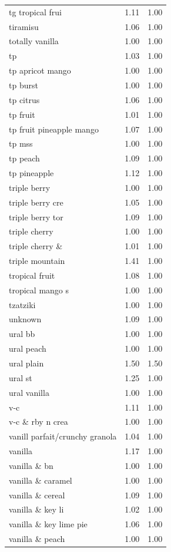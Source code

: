 \begin{table}
\begin{tabular}{lrr}
tg tropical frui & 1.11 & 1.00 \\
tiramisu & 1.06 & 1.00 \\
totally vanilla & 1.00 & 1.00 \\
tp & 1.03 & 1.00 \\
tp apricot mango & 1.00 & 1.00 \\
tp burst & 1.00 & 1.00 \\
tp citrus & 1.06 & 1.00 \\
tp fruit & 1.01 & 1.00 \\
tp fruit pineapple mango & 1.07 & 1.00 \\
tp mss & 1.00 & 1.00 \\
tp peach & 1.09 & 1.00 \\
tp pineapple & 1.12 & 1.00 \\
triple berry & 1.00 & 1.00 \\
triple berry cre & 1.05 & 1.00 \\
triple berry tor & 1.09 & 1.00 \\
triple cherry & 1.00 & 1.00 \\
triple cherry \& & 1.01 & 1.00 \\
triple mountain & 1.41 & 1.00 \\
tropical fruit & 1.08 & 1.00 \\
tropical mango s & 1.00 & 1.00 \\
tzatziki & 1.00 & 1.00 \\
unknown & 1.09 & 1.00 \\
ural bb & 1.00 & 1.00 \\
ural peach & 1.00 & 1.00 \\
ural plain & 1.50 & 1.50 \\
ural st & 1.25 & 1.00 \\
ural vanilla & 1.00 & 1.00 \\
v-c & 1.11 & 1.00 \\
v-c \& rby n crea & 1.00 & 1.00 \\
vanill parfait/crunchy granola & 1.04 & 1.00 \\
vanilla & 1.17 & 1.00 \\
vanilla \& bn & 1.00 & 1.00 \\
vanilla \& caramel & 1.00 & 1.00 \\
vanilla \& cereal & 1.09 & 1.00 \\
vanilla \& key li & 1.02 & 1.00 \\
vanilla \& key lime pie & 1.06 & 1.00 \\
vanilla \& peach & 1.00 & 1.00 \\

\end{tabular}
\end{table}
